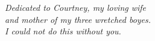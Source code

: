 \chapter*{~}

\begin{center}
\textit{Dedicated to Courtney, my loving wife\\
and mother of my three wretched boyes.\\
I could not do this without you.\\[36pt]}
\end{center}